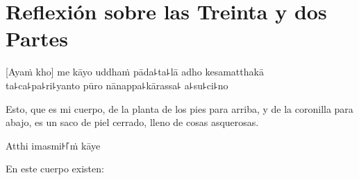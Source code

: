 \chapter[Treinta y dos Partes]{Reflexión sobre las Treinta y dos Partes}


\begin{leader}
\end{leader}

[Ayaṁ kho] me kāyo uddhaṁ pāda꜕ta꜕lā adho kesamatthakā\\
ta꜕ca꜕pa꜕ri꜕yanto pūro nānappa꜕kārassa꜕ a꜕su꜕ci꜕no

\begin{english}
  Esto, que es mi cuerpo, de la planta de los pies para arriba, y de la coronilla para abajo, es un saco de piel cerrado, lleno de cosas asquerosas.
\end{english}

Atthi imasmi꜔꜒ṁ kāye

\begin{english}
  En este cuerpo existen:
\end{english}

